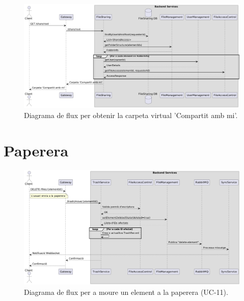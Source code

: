 \begin{figure}[H]
    \centering
    \includegraphics[width=1\textwidth]{Figures/flux/get_shared_root.png}
    \caption{Diagrama de flux per obtenir la carpeta virtual 'Compartit amb mi'.}
    \label{fig:flow_get_shared_root}
\end{figure}

\section{Paperera}

\begin{figure}[H]
    \centering
    \includegraphics[width=1\textwidth]{Figures/flux/move_to_trash.png}
    \caption{Diagrama de flux per a moure un element a la paperera (UC-11).}
    \label{fig:flow_move_to_trash}
\end{figure}

